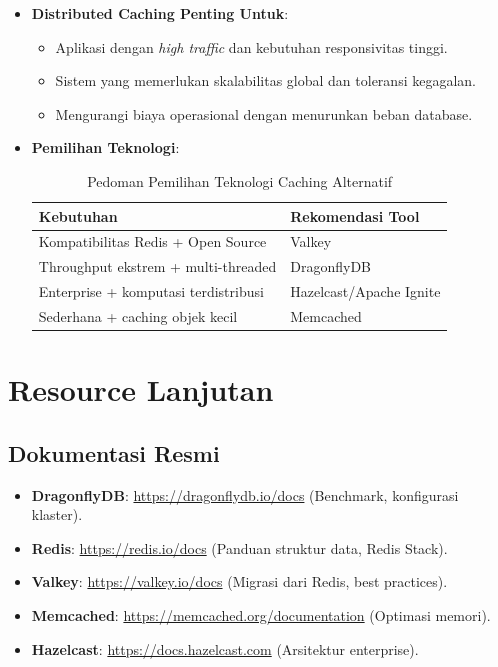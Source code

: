 \documentclass[11pt, a4paper]{book}
\begin{document}
	\begin{itemize}
		\item \textbf{Distributed Caching Penting Untuk}:  
		\begin{itemize}
			\item Aplikasi dengan \textit{high traffic} dan kebutuhan responsivitas tinggi.
			\item Sistem yang memerlukan skalabilitas global dan toleransi kegagalan.
			\item Mengurangi biaya operasional dengan menurunkan beban database.
		\end{itemize}
		
		\item \textbf{Pemilihan Teknologi}:  
		\begin{table}[htbp]
			\centering
			\caption{Pedoman Pemilihan Teknologi Caching Alternatif}
			\label{tab:pemilihan-teknologi}
			\begin{tabularx}{\textwidth}{|l|X|}
				\hline
				\textbf{Kebutuhan} & \textbf{Rekomendasi Tool} \\ \hline
				Kompatibilitas Redis + Open Source & Valkey \\ \hline
				Throughput ekstrem + multi-threaded & DragonflyDB \\ \hline
				Enterprise + komputasi terdistribusi & Hazelcast/Apache Ignite \\ \hline
				Sederhana + caching objek kecil & Memcached \\ \hline
			\end{tabularx}
		\end{table}
	\end{itemize}
	
	\section{Resource Lanjutan}
	\label{sec:resource}
	
	\subsection{Dokumentasi Resmi}
	\label{subsec:dokumentasi}
	
	\begin{itemize}
		\item \textbf{DragonflyDB}:  
		\href{https://dragonflydb.io/docs}{https://dragonflydb.io/docs} (Benchmark, konfigurasi klaster).
		
		\item \textbf{Redis}:  
		\href{https://redis.io/docs}{https://redis.io/docs} (Panduan struktur data, Redis Stack).
		
		\item \textbf{Valkey}:  
		\href{https://valkey.io/docs}{https://valkey.io/docs} (Migrasi dari Redis, best practices).
		
		\item \textbf{Memcached}:  
		\href{https://memcached.org/documentation}{https://memcached.org/documentation} (Optimasi memori).
		
		\item \textbf{Hazelcast}:  
		\href{https://docs.hazelcast.com}{https://docs.hazelcast.com} (Arsitektur enterprise).
	\end{itemize}
	
\end{document}
